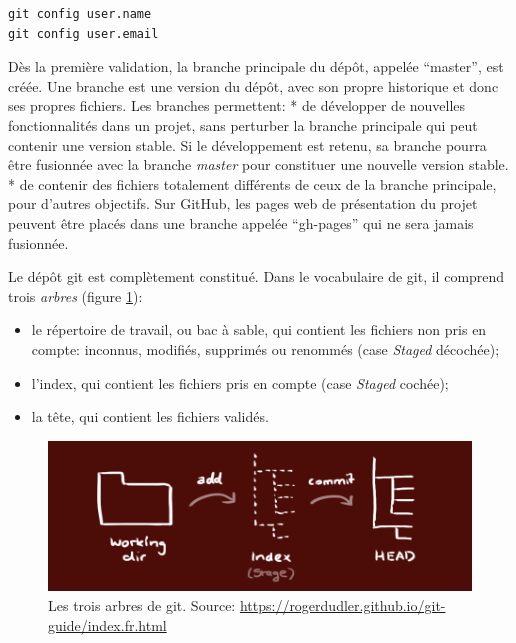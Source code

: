 \documentclass[
  12pt,
  french,
  a4paper,
  extrafontsizes,onecolumn,openright
  ]{memoir}
\providecommand{\tightlist}{%
  \setlength{\itemsep}{0pt}\setlength{\parskip}{0pt}}
\begin{document}
\begin{verbatim}
git config user.name
git config user.email
\end{verbatim}

Dès la première validation, la branche principale du dépôt, appelée \enquote{master}, est créée.
Une branche est une version du dépôt, avec son propre historique et donc ses propres fichiers.
Les branches permettent:
* de développer de nouvelles fonctionnalités dans un projet, sans perturber la branche principale qui peut contenir une version stable. Si le développement est retenu, sa branche pourra être fusionnée avec la branche \emph{master} pour constituer une nouvelle version stable.
* de contenir des fichiers totalement différents de ceux de la branche principale, pour d'autres objectifs. Sur GitHub, les pages web de présentation du projet peuvent être placés dans une branche appelée \enquote{gh-pages} qui ne sera jamais fusionnée.

Le dépôt git est complètement constitué.
Dans le vocabulaire de git, il comprend trois \emph{arbres} (figure \ref{fig:git-Trees}):

\begin{itemize}
\tightlist
\item
  le répertoire de travail, ou bac à sable, qui contient les fichiers non pris en compte: inconnus, modifiés, supprimés ou renommés (case \emph{Staged} décochée);
\item
  l'index, qui contient les fichiers pris en compte (case \emph{Staged} cochée);
\item
  la tête, qui contient les fichiers validés.
\end{itemize}



\scriptsize

\begin{figure}

{\centering \includegraphics[width=0.8\linewidth]{images/git-Trees} 

}

\caption{Les trois arbres de git. Source: \url{https://rogerdudler.github.io/git-guide/index.fr.html}}\label{fig:git-Trees}
\end{figure}
\end{document}
